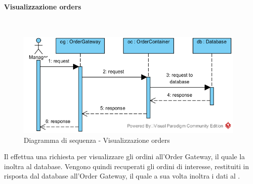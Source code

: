 \begin{samepage}
\paragraph{Visualizzazione orders}\mbox{}\\
\end{samepage}
\begin{figure}[H]
	\centering
	\includegraphics[width=15cm]{../../documenti/SpecificaTecnica/diagrammi/sequenza/direttore_visualizza_orders.png}
	\caption{Diagramma di sequenza - Visualizzazione orders}
\end{figure}
Il \Manager{} effettua una richiesta per visualizzare gli ordini all'Order Gateway, il quale la inoltra al database. Vengono quindi recuperati gli ordini di interesse, restituiti in risposta dal database all'Order Gateway, il quale a sua volta inoltra i dati al \Manager{}.